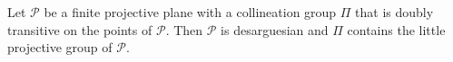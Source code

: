 Let $\mathcal{P}$ be a finite projective plane with a collineation group $\Pi$ that is doubly transitive on the points of $\mathcal{P}$. Then $\mathcal{P}$ is desarguesian and $\Pi$ contains the little projective group of $\mathcal{P}$.
